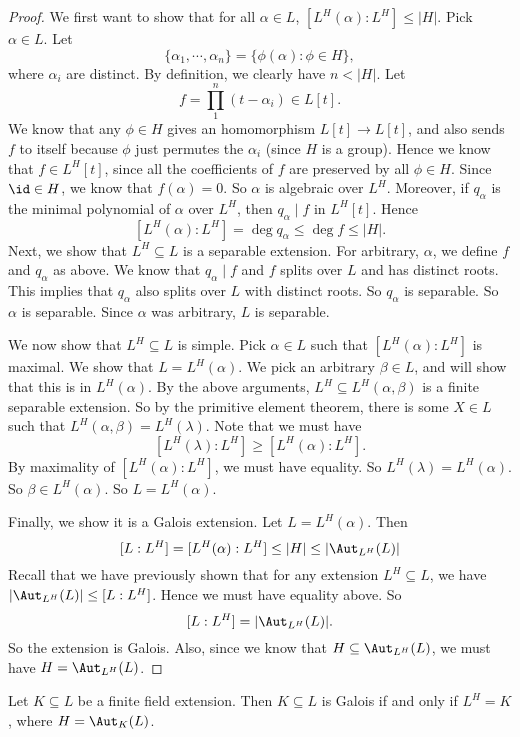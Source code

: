 \documentclass[a4paper]{article}
\begin{document}
\begin{proof}
  We first want to show that for all $\alpha \in L$, $[L^H(\alpha): L^H] \leq |H|$. Pick $\alpha \in L$. Let
  \[
    \{\alpha_1,\cdots, \alpha_n\} = \{\phi(\alpha): \phi \in H\},
  \]
  where $\alpha_i$ are distinct. By definition, we clearly have $n < |H|$. Let
  \[
    f = \prod_1^n (t - \alpha_i) \in L[t].
  \]
  We know that any $\phi \in H$ gives an homomorphism $L[t] \to L[t]$, and also sends $f$ to itself because $\phi$ just permutes the $\alpha_i$ (since $H$ is a group). Hence we know that $f \in L^H[t]$, since all the coefficients of $f$ are preserved by all $\phi \in H$. Since $\id \in H$, we know that $f(\alpha) = 0$. So $\alpha$ is algebraic over $L^H$. Moreover, if $q_\alpha$ is the minimal polynomial of $\alpha$ over $L^H$, then $q_\alpha \mid f$ in $L^H[t]$. Hence
  \[
    [L^H(\alpha): L^H] = \deg q_\alpha \leq \deg f \leq |H|.
  \]
  Next, we show that $L^H\subseteq L$ is a separable extension. For arbitrary, $\alpha$, we define $f$ and $q_\alpha$ as above. We know that $q_\alpha \mid f$ and $f$ splits over $L$ and has distinct roots. This implies that $q_\alpha$ also splits over $L$ with distinct roots. So $q_\alpha$ is separable. So $\alpha$ is separable. Since $\alpha$ was arbitrary, $L$ is separable.

  We now show that $L^H\subseteq L$ is simple. Pick $\alpha \in L$ such that $[L^H(\alpha): L^H]$ is maximal. We show that $L = L^H(\alpha)$. We pick an arbitrary $\beta \in L$, and will show that this is in $L^H(\alpha)$. By the above arguments, $L^H\subseteq L^H(\alpha, \beta)$ is a finite separable extension. So by the primitive element theorem, there is some $X \in L$ such that $L^H(\alpha, \beta) = L^H(\lambda)$. Note that we must have
  \[
    [L^H(\lambda): L^H] \geq [L^H(\alpha): L^H].
  \]
  By maximality of $[L^H(\alpha): L^H]$, we must have equality. So $L^H(\lambda) = L^H(\alpha)$. So $\beta \in L^H(\alpha)$. So $L = L^H(\alpha)$.

  Finally, we show it is a Galois extension. Let $L = L^H(\alpha)$. Then
  \[
    [L:L^H] = [L^H(\alpha): L^H] \leq |H| \leq |\Aut_{L^H}(L)|
  \]
  Recall that we have previously shown that for any extension $L^H\subseteq L$, we have $|\Aut_{L^H}(L)| \leq [L:L^H]$. Hence we must have equality above. So
  \[
    [L:L^H] = |\Aut_{L^H}(L)|.
  \]
  So the extension is Galois. Also, since we know that $H\subseteq \Aut_{L^H}(L)$, we must have $H = \Aut_{L^H}(L)$.
\end{proof}

\begin{thm}
  Let $K\subseteq L$ be a finite field extension. Then $K\subseteq L$ is Galois if and only if $L^H = K$, where $H = \Aut_K(L)$.
\end{thm}
\end{document}
